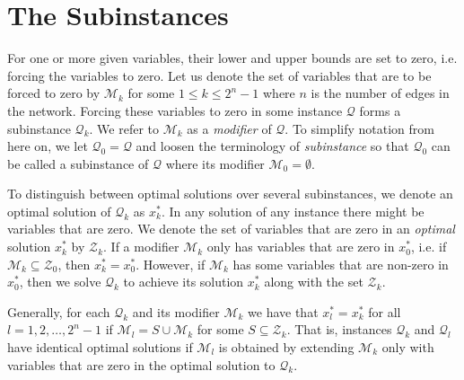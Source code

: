 \section{The Subinstances}
For one or more given variables, their lower and upper bounds are set to zero,
i.e. forcing the variables to zero.
Let us denote the set of variables that are to be forced to zero by
$\mathcal{M}_k$ for some $1 \leq k \leq 2^n - 1$ where $n$ is the number
of edges in the network.
Forcing these variables to zero in some instance $\mathcal{Q}$ forms
a subinstance $\mathcal{Q}_k$. We refer to $\mathcal{M}_k$ as a
\emph{modifier} of $\mathcal{Q}$.
To simplify notation from here on, we let
$\mathcal{Q}_0 = \mathcal{Q}$ and loosen the terminology of
\emph{subinstance} so that $\mathcal{Q}_0$ can be called a subinstance of
$\mathcal{Q}$ where its modifier $\mathcal{M}_0 = \emptyset$.

To distinguish between optimal solutions over several subinstances, we denote
an optimal solution of $\mathcal{Q}_k$ as $x_k^*$.
In any solution of any instance there might be variables that are zero.
We denote the set of variables that are zero in an \emph{optimal} solution
$x_k^*$ by $\mathcal{Z}_k$.
If a modifier $\mathcal{M}_k$ only has variables that are zero in $x_0^*$,
i.e. if $\mathcal{M}_k \subseteq \mathcal{Z}_0$, then $x_k^* = x_0^*$. However,
if $\mathcal{M}_k$ has some variables that are non-zero in $x_0^*$, then
we solve $\mathcal{Q}_k$ to achieve its solution $x_k^*$ along with the set
$\mathcal{Z}_k$.

Generally, for each $\mathcal{Q}_k$ and its modifier $\mathcal{M}_k$ we
have that $x_l^* = x_k^*$ for all $l=1,2,\ldots,2^n-1$ if
$\mathcal{M}_l = S \cup \mathcal{M}_k$ for some $S \subseteq \mathcal{Z}_k$.
That is, instances $\mathcal{Q}_k$ and $\mathcal{Q}_l$ have identical optimal
solutions if $\mathcal{M}_l$ is obtained by extending $\mathcal{M}_k$ only with
variables that are zero in the optimal solution to $\mathcal{Q}_k$.
